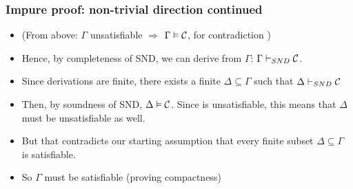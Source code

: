 \begin{frame}
\frametitle{Impure proof: non-trivial direction continued}

\begin{itemize}[<+->]

\item (From above: $\Gamma$ unsatisfiable $\Rightarrow$ $\Gamma \vDash \mathcal{C}$, for contradiction )


\item Hence, by completeness of SND, we can derive  from $\Gamma$: $\Gamma \vdash_{SND} \mathcal{C}$. 

\item Since derivations are finite, there exists a finite $\Delta \subseteq \Gamma$ such that $\Delta \vdash_{SND} \mathcal{C}$

\item Then, by soundness of SND, $\Delta \vDash \mathcal{C}$. Since  is unsatisfiable, this means that $\Delta $ must be unsatisfiable as well. 

\item But that contradicts our starting assumption that every finite subset $\Delta \subseteq \Gamma$ is satisfiable. 

\item So $\Gamma$ must be satisfiable (proving compactness)

\end{itemize}
\end{frame}

